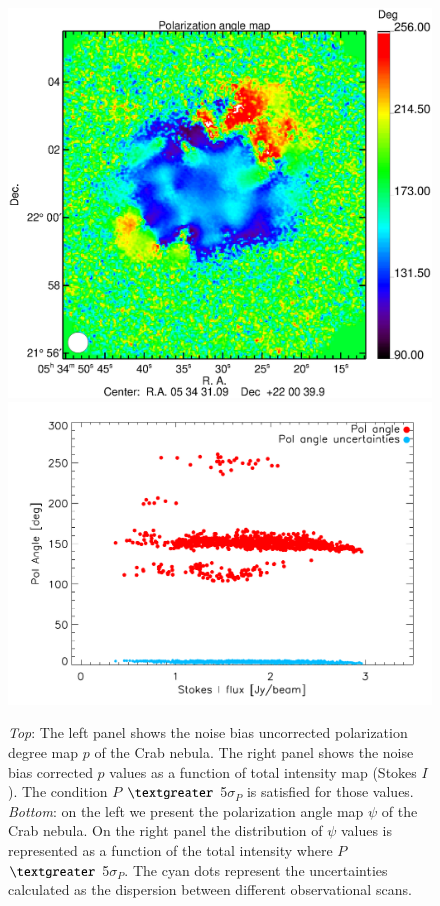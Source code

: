 \documentclass[twocolumn,traditabstract]{aa}
\begin{document}
\begin{figure}
\includegraphics[clip, angle=0, scale = 0.35]{figures/Crab_angle2_2mm.eps}
\includegraphics[clip, angle=0, scale = 0.5]{figures/pol_angle_vs_I_2mm.pdf}
\caption{{\it Top}: The left panel shows the noise bias uncorrected polarization
  degree map $p$ of the Crab nebula. The right panel shows the noise bias
  corrected $p$ values as a function of total intensity map (Stokes $I$). The
  condition $P$ $\textgreater$ 5$\sigma_{P}$ is satisfied for those values. {\it
    Bottom}: on the left we present the polarization angle map $\psi$ of the
  Crab nebula. On the right panel the distribution of $\psi$ values is
  represented as a function of the total intensity where $P$ $\textgreater$
  5$\sigma_{P}$. The cyan dots represent the uncertainties calculated as the
  dispersion between different observational scans.}
\label{fig:pol_degree}
\end{figure}
\end{document}
